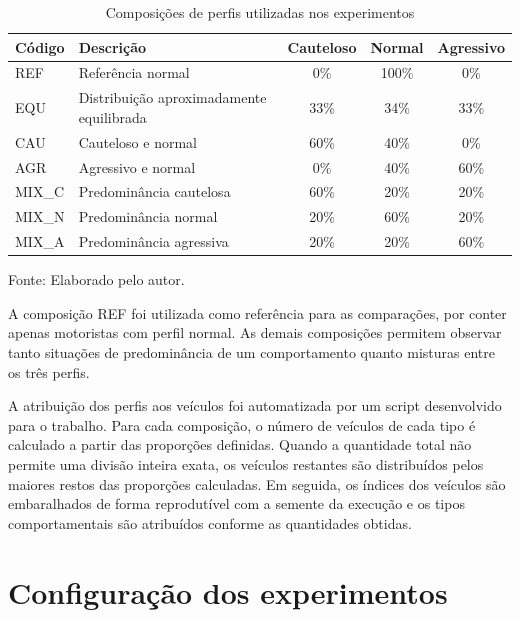 \begin{table}[H]
\centering
\caption{Composições de perfis utilizadas nos experimentos}
\label{tab:composicoes-perfis}
\small
\renewcommand{\arraystretch}{1.18}
\begin{tabular}{|p{2.4cm}|p{5.2cm}|c|c|c|}
\hline
\textbf{Código} & \textbf{Descrição} & \textbf{Cauteloso} & \textbf{Normal} & \textbf{Agressivo} \\
\hline
REF & Referência normal & 0\% & 100\% & 0\% \\
\hline
EQU & Distribuição aproximadamente equilibrada & 33\% & 34\% & 33\% \\
\hline
CAU & Cauteloso e normal & 60\% & 40\% & 0\% \\
\hline
AGR & Agressivo e normal & 0\% & 40\% & 60\% \\
\hline
MIX\_C & Predominância cautelosa & 60\% & 20\% & 20\% \\
\hline
MIX\_N & Predominância normal & 20\% & 60\% & 20\% \\
\hline
MIX\_A & Predominância agressiva & 20\% & 20\% & 60\% \\
\hline
\end{tabular}

\par\vspace{0.25cm}
\begin{minipage}{\textwidth}
\footnotesize Fonte: Elaborado pelo autor.
\end{minipage}
\end{table}

A composição REF foi utilizada como referência para as comparações, por conter apenas motoristas com perfil normal. As demais composições permitem observar tanto situações de predominância de um comportamento quanto misturas entre os três perfis.

A atribuição dos perfis aos veículos foi automatizada por um script desenvolvido para o trabalho. Para cada composição, o número de veículos de cada tipo é calculado a partir das proporções definidas. Quando a quantidade total não permite uma divisão inteira exata, os veículos restantes são distribuídos pelos maiores restos das proporções calculadas. Em seguida, os índices dos veículos são embaralhados de forma reprodutível com a semente da execução e os tipos comportamentais são atribuídos conforme as quantidades obtidas.

\section{Configuração dos experimentos}

